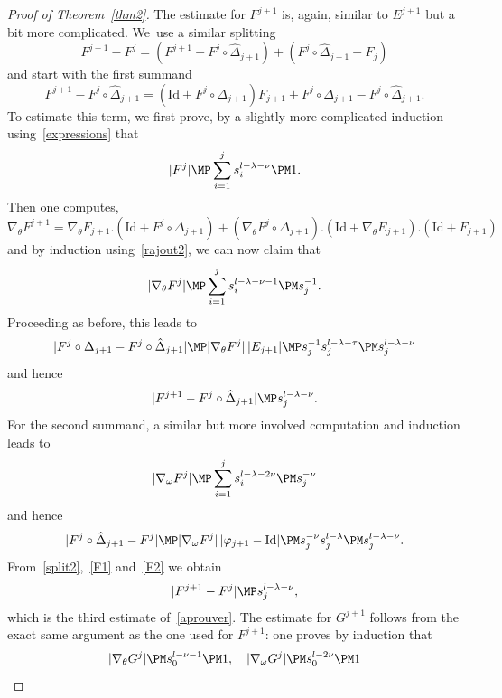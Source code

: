\begin{proof}[Proof of Theorem~\ref{thm2}]
The estimate for $F^{j+1}$ is, again, similar to $E^{j+1}$ but a bit more complicated. We~use a similar splitting
\begin{equation}\label{split2}
F^{j+1}-F^{j}=(F^{j+1}-F^j \circ \hat{\Delta}_{j+1})+(F^j \circ \hat{\Delta}_{j+1}-F_j)
\end{equation}
and start with the first summand
\begin{equation}
F^{j+1}-F^j \circ \hat{\Delta}_{j+1}=(\mathrm{Id}+F^j \circ \Delta_{j+1})F_{j+1}+F^j \circ \Delta_{j+1}-F^j \circ \hat{\Delta}_{j+1}.
\end{equation}
To estimate this term, we first prove, by a slightly more complicated induction using~\eqref{expressions} that
\begin{equation}\label{rajout2}
|F^j| \MP \sum_{i=1}^j s_i^{l-\lambda-\nu} \PM 1.
\end{equation}
Then one computes,
\[ \nabla_\theta F^{j+1}=\nabla_\theta F_{j+1}.(\mathrm{Id}+F^{j}\circ \Delta_{j+1})+(\nabla_\theta F^j \circ \Delta_{j+1}).(\mathrm{Id}+\nabla_\theta E_{j+1}).(\mathrm{Id}+F_{j+1}) \]
and by induction using~\eqref{rajout2}, we can now claim that
\begin{equation*}
|\nabla_\theta F^j| \MP \sum_{i=1}^j s_i^{l-\lambda-\nu-1} \PM s_j^{-1}.
\end{equation*}
Proceeding as before, this leads to
\[ |F^j \circ \Delta_{j+1}-F^j \circ \hat{\Delta}_{j+1}| \MP |\nabla_\theta F^j|\,|E_{j+1}| \MP s_j^{-1}s_j^{l-\lambda-\tau} \PM s_j^{l-\lambda-\nu} \]
and hence
\begin{equation}\label{F1}
|F^{j+1}-F^j \circ \hat{\Delta}_{j+1}| \MP s_j^{l-\lambda-\nu}.
\end{equation}
For the second summand, a similar but more involved computation and induction leads to
\begin{equation*}
|\nabla_\omega F^j| \MP \sum_{i=1}^j s_i^{l-\lambda-2\nu} \PM s_j^{-\nu}
\end{equation*}
and hence
\begin{equation}\label{F2}
|F^j \circ \hat{\Delta}_{j+1}-F^j| \MP |\nabla_\omega F^j|\,|\varphi_{j+1}-\mathrm{Id}| \PM s_j^{-\nu} s_j^{l-\lambda} \PM s_j^{l-\lambda-\nu} .
\end{equation}
From~\eqref{split2},~\eqref{F1} and~\eqref{F2} we obtain
\[ |F^{j+1} -F^j| \MP s_j^{l-\lambda-\nu}, \]
which is the third estimate of~\eqref{aprouver}. The estimate for $G^{j+1}$ follows from the exact same argument as the one used for $F^{j+1}$: one proves by induction that
\[ |\nabla_\theta G^j| \PM s_0^{l-\nu-1} \PM 1, \quad |\nabla_\omega G^j| \PM s_0^{l-2\nu} \PM 1 \]

\end{proof}

